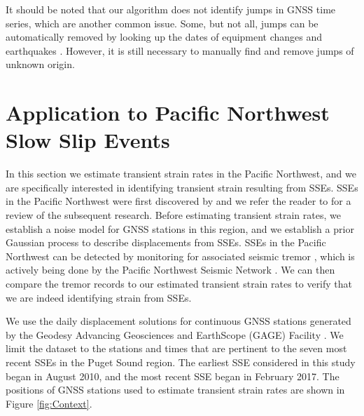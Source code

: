 \documentclass[extra,mreferee]{gji}
\begin{document}

It should be noted that our algorithm does not identify jumps in GNSS
time series, which are another common issue. Some, but not all, jumps
can be automatically removed by looking up the dates of equipment
changes and earthquakes \citep{Gazeaux2013}. However, it is still
necessary to manually find and remove jumps of unknown origin.


\section{Application to Pacific Northwest Slow Slip Events}\label{sec:Cascadia}


In this section we estimate transient strain rates in the Pacific
Northwest, and we are specifically interested in identifying transient
strain resulting from SSEs. SSEs in the Pacific Northwest were first
discovered by \citep[e.g.,][]{Dragert2001} and we refer the reader to
\citet{Schwartz2007} for a review of the subsequent research. Before
estimating transient strain rates, we establish a noise model for GNSS
stations in this region, and we establish a prior Gaussian process to
describe displacements from SSEs. SSEs in the Pacific Northwest can be
detected by monitoring for associated seismic tremor
\citep{Rogers2003}, which is actively being done by the Pacific
Northwest Seismic Network \citep{Wech2010}. We can then compare the
tremor records to our estimated transient strain rates to verify that
we are indeed identifying strain from SSEs.


We use the daily displacement solutions for continuous GNSS stations
generated by the Geodesy Advancing Geosciences and EarthScope (GAGE)
Facility \citep{Herring2016}. We limit the dataset to the stations and
times that are pertinent to the seven most recent SSEs in the Puget
Sound region. The earliest SSE considered in this study began in
August 2010, and the most recent SSE began in February 2017. The
positions of GNSS stations used to estimate transient strain rates are
shown in Figure \ref{fig:Context}.
\end{document}
